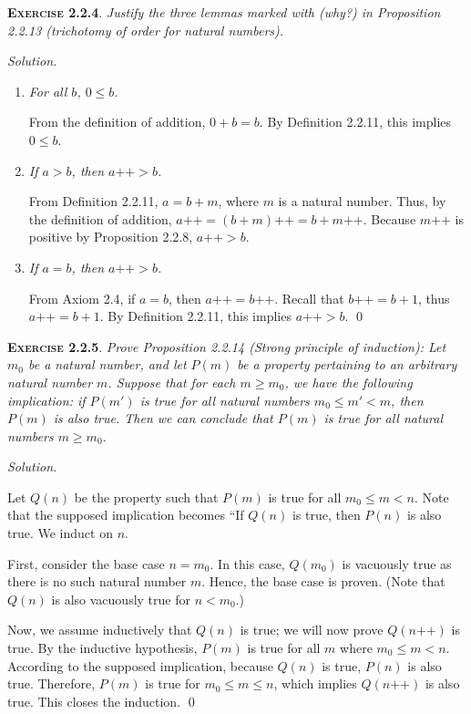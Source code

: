 \documentclass[12pt]{article}
\newcommand{\succr}[1]{#1 \textrm{++}}
\theoremstyle{remark}
\newenvironment{exer}[2]{
    \noindent \setlength{\parskip}{1em}%
    \textsc{\textbf{Exercise #1}}. \textit{#2} \par
    \noindent \textit{Solution.} %
}{\bigskip}
\begin{document}
\begin{exer}{2.2.4}{
    Justify the three lemmas marked with (why?) in Proposition 2.2.13 (trichotomy of order for natural numbers).
}
    \begin{enumerate}[label=(\alph*), topsep=0mm]
        \item \textit{For all $b$, $0 \le b$.}

            From the definition of addition, $0 + b = b$.
            By Definition 2.2.11, this implies $0 \le b$.
            
        \item \textit{If $a > b$, then $\succr{a} > b$.}

            From Definition 2.2.11, $a = b + m$, where $m$ is a natural number.
            Thus, by the definition of addition, $\succr{a} = \succr{(b + m)} = b + \succr{m}$.
            Because $\succr{m}$ is positive by Proposition 2.2.8, $\succr{a} > b$.
        
        \item \textit{If $a = b$, then $\succr{a} > b$.}

            From Axiom 2.4, if $a = b$, then $\succr{a} = \succr{b}$.
            Recall that $\succr{b} = b + 1$, thus $\succr{a} = b + 1$.
            By Definition 2.2.11, this implies $\succr{a} > b$. \qed

    \end{enumerate}
\end{exer}


\begin{exer}{2.2.5}{
    Prove Proposition 2.2.14 (Strong principle of induction):
    Let $m_0$ be a natural number, and let $P(m)$ be a property pertaining to an arbitrary natural number $m$.
    Suppose that for each $m \ge m_0$, we have the following implication: 
    if $P(m')$ is true for all natural numbers $m_0 \le m' < m$, then $P(m)$ is also true.
    Then we can conclude that $P(m)$ is true for all natural numbers $m \ge m_0$.
}
    Let $Q(n)$ be the property such that $P(m)$ is true for all $m_0 \le m < n$.
    Note that the supposed implication becomes ``If $Q(n)$ is true, then $P(n)$ is also true.
    We induct on $n$.

    First, consider the base case $n = m_0$.
    In this case, $Q(m_0)$ is vacuously true as there is no such natural number $m$.
    Hence, the base case is proven.
    (Note that $Q(n)$ is also vacuously true for $n < m_0$.)

    Now, we assume inductively that $Q(n)$ is true; we will now prove $Q(\succr{n})$ is true.
    By the inductive hypothesis, $P(m)$ is true for all $m$ where $m_0 \le m < n$.
    According to the supposed implication, because $Q(n)$ is true, $P(n)$ is also true.
    Therefore, $P(m)$ is true for $m_0 \le m \le n$, which implies $Q(\succr{n})$ is also true.
    This closes the induction. \qed
\end{exer}
\end{document}
